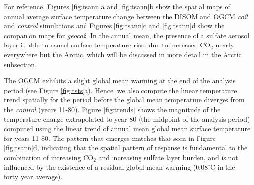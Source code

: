 \documentclass[12pt]{article}
\begin{document}
For reference, Figures \ref{fig:tsann}a and \ref{fig:tsann}b show the spatial maps of annual average surface temperature change between the DISOM and OGCM \textit{co2} and \textit{control} simulations and Figures \ref{fig:tsann}c and \ref{fig:tsann}d show the companion maps for \textit{geoco2}. In the annual mean, the presence of a sulfate aerosol layer is able to cancel surface temperature rises due to increased CO$_2$ nearly everywhere but the Arctic, which will be discussed in more detail in the Arctic subsection.

The OGCM exhibits a slight global mean warming at the end of the analysis period (see Figure \ref{fig:tsts}a). Hence, we also compute the linear temperature trend spatially for the period before the global mean temperature diverges from the \textit{control} (years 11-80). Figure \ref{fig:trends} shows the magnitude of the temperature change extrapolated to year 80 (the midpoint of the analysis period) computed using the linear trend of annual mean global mean surface temperature for years 11-80. The pattern that emerges matches that seen in Figure \ref{fig:tsann}d, indicating that the spatial pattern of response is fundamental to the combination of increasing CO$_2$ and increasing sulfate layer burden, and is not influenced by the existence of a residual global mean warming (0.08$^\circ$C in the forty year average).  
\end{document}
